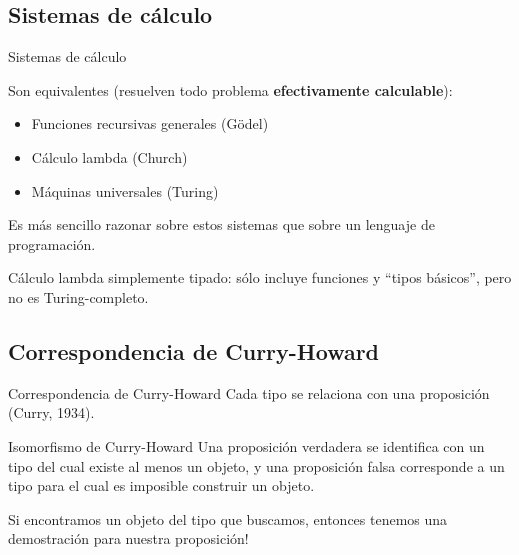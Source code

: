 \subsection{Sistemas de cálculo}

\begin{frame}{Sistemas de cálculo}

Son equivalentes (resuelven todo problema \textbf{efectivamente calculable}):
\begin{itemize}
\item Funciones recursivas generales (Gödel)
\item Cálculo lambda (Church)
\item Máquinas universales (Turing)
\end{itemize}

Es más sencillo razonar sobre estos sistemas que sobre un lenguaje de programación.

Cálculo lambda simplemente tipado: sólo incluye funciones y ``tipos básicos'', pero no es Turing-completo.
\end{frame}


\subsection{Correspondencia de Curry-Howard}

\begin{frame}{Correspondencia de Curry-Howard}
Cada tipo se relaciona con una proposición (Curry, 1934).

\begin{exampleblock}{Isomorfismo de Curry-Howard}
Una proposición verdadera se identifica con un tipo del cual existe al menos un objeto, y una proposición falsa corresponde a un tipo para el cual es imposible construir un objeto.
\end{exampleblock}

Si encontramos un objeto del tipo que buscamos, entonces tenemos una demostración para nuestra proposición!

\end{frame}

